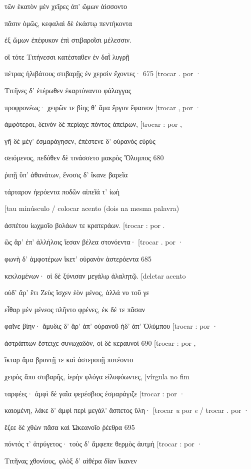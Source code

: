 τῶν ἑκατὸν μὲν χεῖρες ἀπ' ὤμων ἀίσσοντο

πᾶσιν ὁμῶς, κεφαλαὶ δὲ ἑκάστῳ πεντήκοντα

ἐξ ὤμων ἐπέφυκον ἐπὶ στιβαροῖσι μέλεσσιν.

οἳ τότε Τιτήνεσσι κατέσταθεν ἐν δαῒ λυγρῇ

πέτρας ἠλιβάτους στιβαρῇς ἐν χερσὶν ἔχοντες· 675 {[}trocar . por ·

Τιτῆνες δ' ἑτέρωθεν ἐκαρτύναντο φάλαγγας

προφρονέως· χειρῶν τε βίης θ' ἅμα ἔργον ἔφαινον {[}trocar , por ·

ἀμφότεροι, δεινὸν δὲ περίαχε πόντος ἀπείρων, {[}trocar : por ,

γῆ δὲ μέγ' ἐσμαράγησεν, ἐπέστενε δ' οὐρανὸς εὐρὺς

σειόμενος, πεδόθεν δὲ τινάσσετο μακρὸς Ὄλυμπος 680

ῥιπῇ ὕπ' ἀθανάτων, ἔνοσις δ' ἵκανε βαρεῖα

τάρταρον ἠερόεντα ποδῶν αἰπεῖά τ' ἰωὴ

{[}tau minúsculo / colocar acento (dois na mesma palavra)

ἀσπέτου ἰωχμοῖο βολάων τε κρατεράων. {[}trocar : por .

ὣς ἄρ' ἐπ' ἀλλήλοις ἵεσαν βέλεα στονόεντα· {[}trocar . por ·

φωνὴ δ' ἀμφοτέρων ἵκετ' οὐρανὸν ἀστερόεντα 685

κεκλομένων· οἱ δὲ ξύνισαν μεγάλῳ ἀλαλητῷ. {[}deletar acento

οὐδ' ἄρ' ἔτι Ζεὺς ἴσχεν ἑὸν μένος, ἀλλά νυ τοῦ γε

εἶθαρ μὲν μένεος πλῆντο φρένες, ἐκ δέ τε πᾶσαν

φαῖνε βίην· ἄμυδις δ' ἄρ' ἀπ' οὐρανοῦ ἠδ' ἀπ' Ὀλύμπου {[}trocar : por ·

ἀστράπτων ἔστειχε συνωχαδόν, οἱ δὲ κεραυνοὶ 690 {[}trocar : por ,

ἴκταρ ἅμα βροντῇ τε καὶ ἀστεροπῇ ποτέοντο

χειρὸς ἄπο στιβαρῆς, ἱερὴν φλόγα εἰλυφόωντες, {[}vírgula no fim

ταρφέες· ἀμφὶ δὲ γαῖα φερέσβιος ἐσμαράγιζε {[}trocar : por ·

καιομένη, λάκε δ' ἀμφὶ περὶ μεγάλ' ἄσπετος ὕλη· {[}trocar \emph{u} por
\emph{e} / trocar . por ·

ἔζεε δὲ χθὼν πᾶσα καὶ Ὠκεανοῖο ῥέεθρα 695

πόντός τ' ἀτρύγετος· τοὺς δ' ἄμφεπε θερμὸς ἀυτμὴ {[}trocar : por ·

Τιτῆνας χθονίους, φλὸξ δ' αἰθέρα δῖαν ἵκανεν

